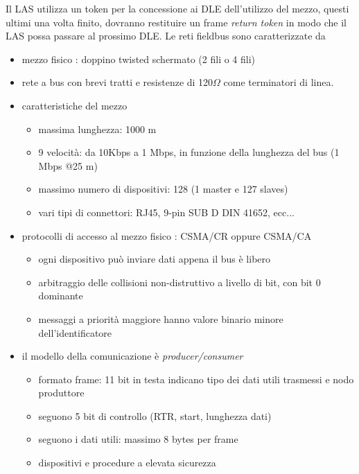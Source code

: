 \documentclass[10pt, letterpaper]{report}
\begin{document}
Il LAS utilizza un token per la concessione ai DLE dell'utilizzo del mezzo, questi ultimi una volta finito, dovranno restituire un frame \textit{return token} in modo che il LAS possa passare al prossimo DLE. Le reti fieldbus sono caratterizzate da \begin{itemize}
    \item mezzo fisico : doppino twisted schermato (2 fili o 4 fili)
    \item rete a bus con brevi tratti e resistenze di 120$\Omega$ come terminatori di linea. 
    \item caratteristiche del mezzo\begin{itemize}
        \item massima lunghezza: 1000 m
        \item 9 velocità: da 10Kbps a 1 Mbps, in funzione della lunghezza del bus (1 Mbps @25 m)
        \item massimo numero di dispositivi: 128 (1 master e 127 slaves)
        \item vari tipi di connettori: RJ45, 9-pin SUB D DIN 41652, ecc...
    \end{itemize}
    \item protocolli di accesso al mezzo fisico : CSMA/CR oppure CSMA/CA\begin{itemize}
        \item ogni dispositivo può inviare dati appena il bus è libero
        \item arbitraggio delle collisioni non-distruttivo a livello di bit, con bit 0 dominante
        \item messaggi a priorità maggiore hanno valore binario minore dell'identificatore
    \end{itemize}
    \item il modello della comunicazione è \textit{producer/consumer}\begin{itemize}
        \item formato frame: 11 bit in testa indicano tipo dei dati utili trasmessi e nodo produttore
        \item seguono 5 bit di controllo (RTR, start, lunghezza dati)
        \item seguono i dati utili: massimo 8 bytes per frame
        \item dispositivi e procedure a elevata sicurezza
    \end{itemize}
\end{itemize}
\end{document}
